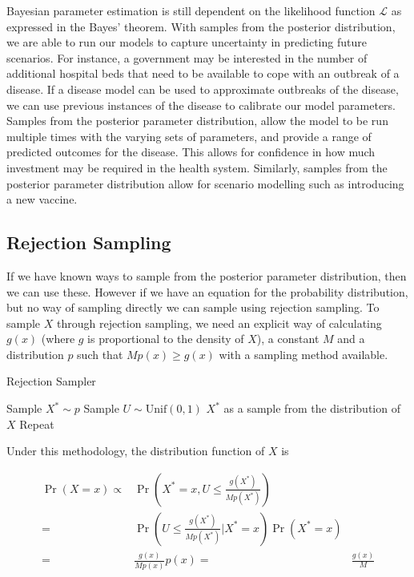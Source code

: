 Bayesian parameter estimation is still dependent on the likelihood function
$\mathcal{L}$ as expressed in the Bayes' theorem.
With samples from the posterior distribution, we are
able to run our models to capture uncertainty in predicting future scenarios.
For instance, a government may be interested in the number of additional
hospital beds that need to be available to cope with an outbreak of a disease.
If a disease model can be used to approximate outbreaks of the disease,
we can use previous instances of the disease to calibrate our model parameters.
Samples from the posterior parameter distribution, allow
the model to be run multiple times with the varying sets of parameters,
and provide a range of predicted outcomes for the disease. This allows for
confidence in how much investment may be required in the health system.
Similarly, samples from the posterior parameter distribution allow for scenario
modelling such as introducing a new vaccine.

\subsection*{Rejection Sampling}

If we have known ways to sample from the posterior parameter distribution,
then we can use these. However if we have an equation for the probability
distribution, but no way of sampling directly we can sample using rejection
sampling. To sample $X$ through rejection sampling,
we need an explicit way of calculating
$g(x)$ (where $g$ is proportional to the density of $X$), a constant $M$ and
a distribution $p$ such that $Mp(x) \geq g(x)$ with a sampling method
available.

\begin{algorithm}
    \caption{Rejection Sampler}
    \label{alg:rej_samp}
    \begin{algorithmic}[1]
        \State Sample $X^\ast \sim p$
        \State Sample $U \sim \mathrm{Unif}(0, 1)$
        \State \Return $X^\ast$ as a sample from the distribution of $X$
        \Else
        \State Repeat
        \EndIf
    \end{algorithmic}
\end{algorithm}

Under this methodology, the distribution function of $X$ is

\begin{align*}
    \Pr(X = x)
    \propto & \Pr(X^\ast = x , U \leq \frac{g(X^\ast)}{M p(X^\ast)})
    \tag*{where the probabilities may be interpreted as densities}                   \\
    =       & \Pr(U \leq \frac{g(X^\ast)}{M p(X^\ast)} | X^\ast = x) \Pr(X^\ast = x) \\
    =       & \frac{g(x)}{M p(x)} p(x)
    =       & \frac{g(x)}{M}
\end{align*}

